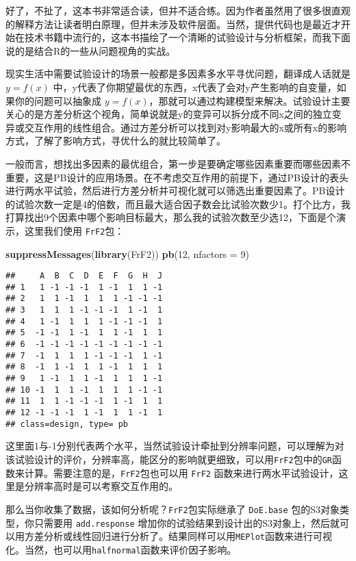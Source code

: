 \documentclass[]{tufte-book}
\newenvironment{Shaded}{}{}
\newcommand{\DataTypeTok}[1]{\textcolor[rgb]{0.56,0.13,0.00}{#1}}
\newcommand{\DecValTok}[1]{\textcolor[rgb]{0.25,0.63,0.44}{#1}}
\newcommand{\KeywordTok}[1]{\textcolor[rgb]{0.00,0.44,0.13}{\textbf{#1}}}
\newcommand{\NormalTok}[1]{#1}
\begin{document}
好了，不扯了，这本书非常适合读，但并不适合练。因为作者虽然用了很多很直观的解释方法让读者明白原理，但并未涉及软件层面。当然，提供代码也是最近才开始在技术书籍中流行的，这本书描绘了一个清晰的试验设计与分析框架，而我下面说的是结合R的一些从问题视角的实战。

现实生活中需要试验设计的场景一般都是多因素多水平寻优问题，翻译成人话就是 \(y = f(x)\) 中，y代表了你期望最优的东西，x代表了会对y产生影响的自变量，如果你的问题可以抽象成 \(y = f(x)\)，那就可以通过构建模型来解决。试验设计主要关心的是方差分析这个视角，简单说就是y的变异可以拆分成不同x之间的独立变异或交互作用的线性组合。通过方差分析可以找到对y影响最大的x或所有x的影响方式，了解了影响方式，寻优什么的就比较简单了。

一般而言，想找出多因素的最优组合，第一步是要确定哪些因素重要而哪些因素不重要，这是PB设计的应用场景。在不考虑交互作用的前提下，通过PB设计的表头进行两水平试验，然后进行方差分析并可视化就可以筛选出重要因素了。PB设计的试验次数一定是4的倍数，而且最大适合因子数会比试验次数少1。打个比方，我打算找出9个因素中哪个影响目标最大，那么我的试验次数至少选12，下面是个演示，这里我们使用 \texttt{FrF2}包：

\begin{Shaded}
\begin{Highlighting}[]
\KeywordTok{suppressMessages}\NormalTok{(}\KeywordTok{library}\NormalTok{(FrF2))}
\KeywordTok{pb}\NormalTok{(}\DecValTok{12}\NormalTok{, }\DataTypeTok{nfactors =} \DecValTok{9}\NormalTok{)}
\end{Highlighting}
\end{Shaded}

\begin{verbatim}
##     A  B  C  D  E  F  G  H  J
## 1   1 -1 -1 -1  1 -1  1  1 -1
## 2   1  1 -1  1  1  1 -1 -1 -1
## 3   1  1  1 -1 -1 -1  1 -1  1
## 4   1 -1  1  1  1 -1 -1 -1  1
## 5  -1 -1  1 -1  1  1 -1  1  1
## 6  -1 -1 -1 -1 -1 -1 -1 -1 -1
## 7  -1  1  1  1 -1 -1 -1  1 -1
## 8  -1  1 -1  1  1 -1  1  1  1
## 9   1 -1  1  1 -1  1  1  1 -1
## 10 -1  1  1 -1  1  1  1 -1 -1
## 11  1  1 -1 -1 -1  1 -1  1  1
## 12 -1 -1 -1  1 -1  1  1 -1  1
## class=design, type= pb
\end{verbatim}

这里面1与-1分别代表两个水平，当然试验设计牵扯到分辨率问题，可以理解为对该试验设计的评价，分辨率高，能区分的影响就更细致，可以用\texttt{FrF2}包中的\texttt{GR}函数来计算。需要注意的是，\texttt{FrF2}包也可以用 \texttt{FrF2} 函数来进行两水平试验设计，这里是分辨率高时是可以考察交互作用的。

那么当你收集了数据，该如何分析呢？\texttt{FrF2}包实际继承了 \texttt{DoE.base} 包的S3对象类型，你只需要用 \texttt{add.response} 增加你的试验结果到设计出的S3对象上，然后就可以用方差分析或线性回归进行分析了。结果同样可以用\texttt{MEPlot}函数来进行可视化。当然，也可以用\texttt{halfnormal}函数来评价因子影响。
\end{document}
